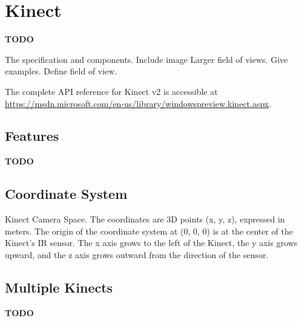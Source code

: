 \section{Kinect}
\label{sec:kinect}

\textbf{TODO}

The specification and components. Include image Larger field of views. Give examples. Define field of view.

The complete API reference for Kinect v2 is accessible at {\url{https://msdn.microsoft.com/en-us/library/windowspreview.kinect.aspx}}.

\subsection{Features}

\textbf{TODO}

\subsection{Coordinate System}

Kinect Camera Space. The coordinates are 3D points (x, y, z), expressed in meters. The origin of the coordinate system at (0, 0, 0) is at the center of the Kinect's IR sensor. The x axis grows to the left of the Kinect, the y axis grows upward, and the z axis grows outward from the direction of the sensor.

\cite{microsoft_kinect_coordinates}

\subsection{Multiple Kinects}

\textbf{TODO}
